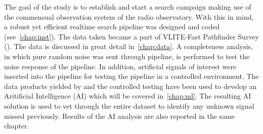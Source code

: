\par The goal of the study is to establish and start a search campaign making use of the commensual observation system \vlite of the \vla radio observatory.
With this in mind, a robust yet efficient realtime search pipeline was designed and coded (see~\autoref{chap:inst}).
The data taken became a part of VLITE-Fast Pathfinder Survey (\vfpfs). The data is discussed in great detail in~\autoref{chap:data}.
A completeness analysis, in which pure random noise was sent through pipeline, is performed to test the noise response of the pipeline. In addition, artificial signals of interest were inserted into the pipeline for testing the pipeline in a controlled environment. 
The data products yielded by \vfpfs and the controlled testing have been used to develop an Aritificial Intelligence (AI) which will be covered in~\autoref{chap:ml}.
The resulting AI solution is used to vet through the entire \vfpfs dataset to identify any unknown signal missed previously. Results of the AI analysis are also reported in the same chapter. 


